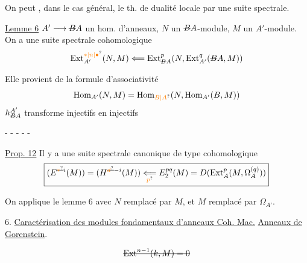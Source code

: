On peut , dans le cas général, le th. de dualité locale par une suite spectrale.

\uline{Lemme 6} $A'\longrightarrow\deleted{B}A$ un hom. d'anneaux, $N$ un $\deleted{B}A$-module, $M$ un $A'$-module. On a une suite spectrale cohomologique
\[
\operatorname{Ext}_{A'}^{\unsure{*|n|\bullet}}(N,M)\Longleftarrow
\operatorname{Ext}_{\deleted{B}A}^{p}(N,\operatorname{Ext}_{A'}^{q}(\deleted{B}A,M))
\]

Elle provient de la formule d'associativité
\[
\operatorname{Hom}_{A'}(N,M)=\operatorname{Hom}_{\unsure{B|A}}(N,\operatorname{Hom}_{A'}(B,M))
\]
$h_{\deleted{B}A}^{A'}$ transforme injectifs en injectifs

\centerline{- - - - -}

\uline{Prop. 12}  Il y a une suite spectrale canonique de type cohomologique
\[
\boxed{(E^{\deleted{\unsure{*}}i}(M))=(H^{\deleted{\unsure{d}}-i}(M))\underset{\unsure{p}}{\Longleftarrow}
 E_2^{pq}(M)=D(\operatorname{Ext}_{A}^{p}(M,\Omega_{A}^{(q)}))}
\]

On applique le lemme 6 avec $N$\deleted{\unsure{$=$}} remplacé par $M$, et $M$ remplacé par $\Omega_{A'}$.

6. \uline{Caractérisation des modules fondamentaux d'anneaux Coh. Mac.} \uline{Anneaux de Gorenstein}.


\[
\deleted{\operatorname{Ext}^{n-1}(k,M)=0}
\]


